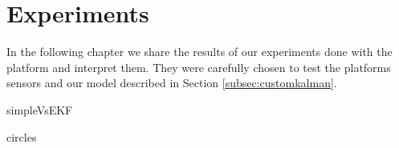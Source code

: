 \documentclass[class=article, crop=false]{standalone}
\begin{document}
\chapter{Experiments}\label{cha:exp}

In the following chapter we share the results of our experiments done with the platform and interpret them. They were carefully chosen to test the platforms sensors and our model described in Section \ref{subsec:customkalman}.


{simpleVsEKF}

{circles}
\end{document}
